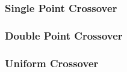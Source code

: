 \documentclass[a4paper,11pt]{article}
\begin{document}
\subsubsection*{Single Point Crossover}

\subsubsection*{Double Point Crossover}
\subsubsection*{Uniform Crossover}
\end{document}
